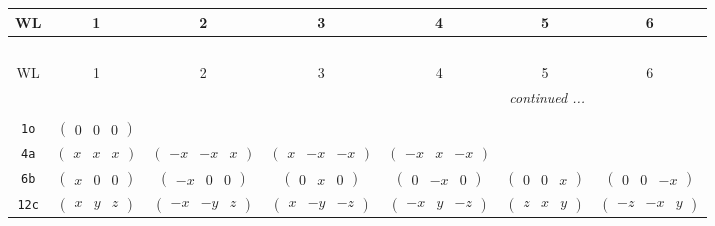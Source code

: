 \documentclass[fleqn,9pt,landscape]{jsarticle}
\begin{document}
\begin{center}
\renewcommand{\arraystretch}{1.2}
\begin{longtable}{ccccccc}
 \hline \hline
WL & 1 & 2 & 3 & 4 & 5 & 6 \\ \hline \endfirsthead

\multicolumn{6}{l}{\tablename\ \thetable{}} \\
 \hline \hline
WL & 1 & 2 & 3 & 4 & 5 & 6 \\ \hline \endhead

 \hline \hline
\multicolumn{6}{r}{\footnotesize\it continued ...} \\ \endfoot

 \hline \hline
\multicolumn{6}{r}{} \\ \endlastfoot

{\tt 1o} & $ \begin{pmatrix} 0 & 0 & 0 \end{pmatrix} $ & $  $ & $  $ & $  $ & $  $ & $  $ \\ \hline
{\tt 4a} & $ \begin{pmatrix} x & x & x \end{pmatrix} $ & $ \begin{pmatrix} - x & - x & x \end{pmatrix} $ & $ \begin{pmatrix} x & - x & - x \end{pmatrix} $ & $ \begin{pmatrix} - x & x & - x \end{pmatrix} $ & $  $ & $  $ \\ \hline
{\tt 6b} & $ \begin{pmatrix} x & 0 & 0 \end{pmatrix} $ & $ \begin{pmatrix} - x & 0 & 0 \end{pmatrix} $ & $ \begin{pmatrix} 0 & x & 0 \end{pmatrix} $ & $ \begin{pmatrix} 0 & - x & 0 \end{pmatrix} $ & $ \begin{pmatrix} 0 & 0 & x \end{pmatrix} $ & $ \begin{pmatrix} 0 & 0 & - x \end{pmatrix} $ \\ \hline
{\tt 12c} & $ \begin{pmatrix} x & y & z \end{pmatrix} $ & $ \begin{pmatrix} - x & - y & z \end{pmatrix} $ & $ \begin{pmatrix} x & - y & - z \end{pmatrix} $ & $ \begin{pmatrix} - x & y & - z \end{pmatrix} $ & $ \begin{pmatrix} z & x & y \end{pmatrix} $ & $ \begin{pmatrix} - z & - x & y \end{pmatrix} $ \\

\end{longtable}
\end{center}
\end{document}

